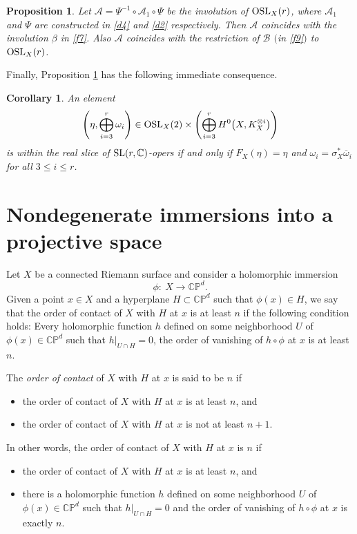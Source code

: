 \documentclass[10pt,a4paper]{amsart}
\numberwithin{equation}{section}
\newtheorem{Corollary}[Theorem]{Corollary}
\newtheorem{Proposition}[Theorem]{Proposition}
 { \theoremstyle{definition}
\newtheorem{Definition}[Theorem]{Definition}
\newtheorem{Note}[Theorem]{Note}
\newtheorem{Example}[Theorem]{Example}
\newtheorem{Remark}[Theorem]{Remark} }
\begin{document}
\begin{Proposition}\label{lem4}
Let ${\mathcal A} = \Psi^{-1}\circ{\mathcal A}_1\circ\Psi$ be the involution of
${\rm OSL}_X(r)$, where ${\mathcal A}_1$ and $\Psi$
are constructed in \eqref{d4} and \eqref{d2} respectively. Then ${\mathcal A}$ coincides
with the involution $\beta$ in \eqref{f7}. Also ${\mathcal A}$ coincides
with the restriction of $\mathcal B$ $($in \eqref{f9}$)$ to ${\rm OSL}_X(r)$.
\end{Proposition}

Finally, Proposition \ref{lem4} has the following immediate consequence.

\begin{Corollary}\label{corpr3}
An element
\[
\left(\eta, \bigoplus_{i=3}^r \omega_i\right) \in
{\rm OSL}_X(2)\times \left(\bigoplus_{i=3}^r H^0\bigl(X, K^{\otimes i}_X\bigr)\right)
\]
is within the real slice of ${\rm SL}(r,{\mathbb C})$-opers if and only if
$F_X(\eta) = \eta$ and $\omega_i = \sigma^*_X\overline{\omega}_i$ for all $3 \leq i \leq r$.
\end{Corollary}


\section{Nondegenerate immersions into a projective space}

Let $X$ be a connected Riemann surface and consider a holomorphic immersion
\[
\phi\colon\ X \longrightarrow {\mathbb C}{\mathbb P}^d.
\]
Given a point $x \in X$ and a hyperplane
$H \subset {\mathbb C}{\mathbb P}^d$ such that $\phi(x) \in H$,
we say that the order of contact of $X$ with $H$ at $x$ is at least $n$
if the following condition holds: Every holomorphic function $h$ defined on some
neighborhood $U$ of $\phi(x) \in {\mathbb C}{\mathbb P}^d$ such that
$h\big\vert_{U\cap H} = 0$, the order of vanishing of $h\circ\phi$ at
$x$ is at least $n$.

\begin{Definition}The {\it order of contact} of $X$ with $H$ at $x$ is said to
be $n$ if
\begin{itemize}\itemsep=0pt
\item the order of contact of $X$ with $H$ at $x$ is at least $n$, and

\item the order of contact of $X$ with $H$ at $x$ is not at least $n+1$.
\end{itemize}
\end{Definition}
In other words, the order of contact of $X$ with $H$ at $x$ is $n$ if
\begin{itemize}\itemsep=0pt
\item the order of contact of $X$ with $H$ at $x$ is at least $n$, and

\item there is a holomorphic function $h$ defined on some
neighborhood $U$ of $\phi(x) \in {\mathbb C}{\mathbb P}^d$ such that
$h\big\vert_{U\cap H} = 0$ and the order of vanishing of $h\circ\phi$ at
$x$ is exactly $n$.
\end{itemize}
\end{document}
